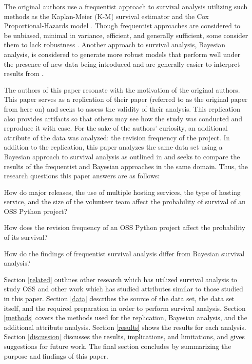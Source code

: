 \documentclass[acmconf]{acmart}
\begin{document}
The original authors use a frequentist approach to survival analysis utilizing such methods as the Kaplan-Meier (K-M) survival estimator and the Cox Proportional-Hazards model \cite{kaplan1958nonparametric, cox1972regression}.
Though frequentist approaches are considered to be unbiased, minimal in variance, efficient, and generally sufficient, some consider them to lack robustness \cite{renganathan2016overview}. Another approach to survival analysis, Bayesian analysis, is considered to generate more robust models that perform well under the presence of new data being introduced and are generally easier to interpret results from \cite{renganathan2016overview}.

The authors of this paper resonate with the motivation of the original authors. 
This paper serves as a replication of their paper \cite{ali2020cheating} (referred to as the original paper from here on) and seeks to assess the validity of their analysis.
This replication also provides artifacts so that others may see how the study was conducted and reproduce it with ease.
For the sake of the authors' curiosity, an additional attribute of the data was analyzed: the revision frequency of the project.
In addition to the replication, this paper analyzes the same data set using a Bayesian approach to survival analysis as outlined in \cite{kelter2020bayesian} and seeks to compare the results of the frequentist and Bayesian approaches in the same domain.
Thus, the research questions this paper answers are as follows:

\begin{questions}
    \item How do major releases, the use of multiple hosting services, the type of hosting service, and the size of the volunteer team affect the probability of survival of an OSS Python project?
    \item How does the revision frequency of an OSS Python project affect the probability of its survival?
    \item How do the findings of frequentist survival analysis differ from Bayesian survival analysis?
\end{questions}

Section \ref{related} outlines other research which has utilized survival analysis to study OSS and other work which has studied attributes similar to those studied in this paper.
Section \ref{data} describes the source of the data set, the data set itself, and the required preparation in order to perform survival analysis.
Section \ref{methods} covers the methods used for the replication, Bayesian analysis, and the additional attribute analysis.
Section \ref{results} shows the results for each analysis.
Section \ref{discussion} discusses the results, implications, and limitations, and gives suggestions for future work.
The final section concludes by summarizing the purpose and findings of this paper.
\end{document}
